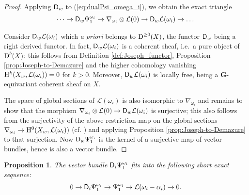 \documentclass[sn-mathphys-num]{sn-jnl}%
\newcommand{\Ll}{\mathcal L}
\newcommand*{\Dd}{\mathop{\mathrm D\kern0pt}\nolimits}
\newcommand{\sd}{\sf D}
\newcommand{\bg}{\mathbf G}
\newtheorem{proposition}[theorem]{Proposition}
\theoremstyle{definition}
\begin{document}
\begin{proof}
Applying ${\sd }_w$ to (\ref{eq:dualPsi_omega_i}), we obtain the exact triangle 
\begin{equation}\label{eq:D_wtoPsi-omega_i}
\dots \rightarrow {\sd }_w\Psi _1^{\omega _i}\rightarrow \nabla _{\omega _i}\otimes \Ll (0)\rightarrow {\sd }_w\Ll (\omega _i)\rightarrow \dots 
\end{equation}

Consider ${\sd }_w\Ll (\omega _i)$ which {\it a priori} belongs to $\Dd ^{\geq 0}(X)$, the functor ${\sd }_w$ being a right derived functor. In fact, ${\sd }_w\Ll (\omega _i)$ is a coherent sheaf, i.e.\ a pure object of $\Dd ^b(X)$: this follows from Definition \ref{def:Joseph_functor}, Proposition \ref{prop:Joseph-to-Demazure} and the higher cohomology vanishing ${\rm H}^k(X_w,\Ll (\omega _i))=0$ for $k>0$. Moreover, ${\sd }_w\Ll (\omega _i)$ is locally free, being a ${ \bg}$-equivariant coherent sheaf on $X$. 

The space of global sections 
of
$\Ll (\omega _i)$ is also isomorphic to $\nabla _{\omega _i}$ and remains to show that the morphism $\nabla _{\omega _i}\otimes \Ll (0)\rightarrow {\sd }_w\Ll (\omega _i)$ is surjective; this also follows from the surjectivity of the above restriction map on the global sections $\nabla _{\omega _i}\rightarrow {\rm H}^0(X_w,\Ll (\omega _i))$ (cf. \cite[Proposition A.2.6]{WvdKTata}) and applying Proposition \ref{prop:Joseph-to-Demazure} to that surjection. Now ${\sd }_w\Psi _1^{\omega _i}$ is the kernel of a surjective map of vector bundles, hence is also a vector bundle.
\end{proof}

\begin{proposition}\label{prop:D_iPsi_i}
The vector bundle ${\sd }_i\Psi _1^{\omega _i}$ fits into the following short exact sequence:
\begin{equation}
0\rightarrow {\sd }_i\Psi _1^{\omega _i}\rightarrow \Psi _1^{\omega _i}\rightarrow \Ll (\omega _i-\alpha _i)\rightarrow 0.
\end{equation}
\end{proposition}
\end{document}
